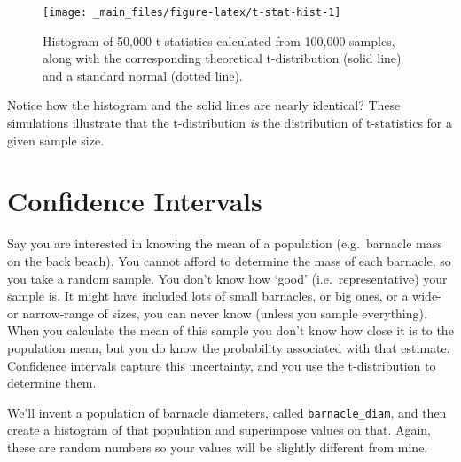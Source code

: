 \documentclass[
  11pt,
  a4paper,
]{book}
\begin{document}
\begin{figure}

{\centering \texttt{[image: \_main\_files/figure-latex/t-stat-hist-1]} 

}

\caption{Histogram of 50,000 t-statistics calculated from 100,000 samples, along with the corresponding theoretical t-distribution (solid line) and a standard normal (dotted line).}\label{fig:t-stat-hist}
\end{figure}

Notice how the histogram and the solid lines are nearly identical? These simulations illustrate that the t-distribution \emph{is} the distribution of t-statistics for a given sample size.

\hypertarget{confidence-intervals}{%
\section{Confidence Intervals}\label{confidence-intervals}}

Say you are interested in knowing the mean of a population (e.g.~barnacle mass on the back beach). You cannot afford to determine the mass of each barnacle, so you take a random sample. You don't know how `good' (i.e.~representative) your sample is. It might have included lots of small barnacles, or big ones, or a wide- or narrow-range of sizes, you can never know (unless you sample everything). When you calculate the mean of this sample you don't know how close it is to the population mean, but you do know the probability associated with that estimate. Confidence intervals capture this uncertainty, and you use the t-distribution to determine them.

We'll invent a population of barnacle diameters, called \texttt{barnacle\_diam}, and then create a histogram of that population and superimpose values on that. Again, these are random numbers so your values will be slightly different from mine.
\end{document}
